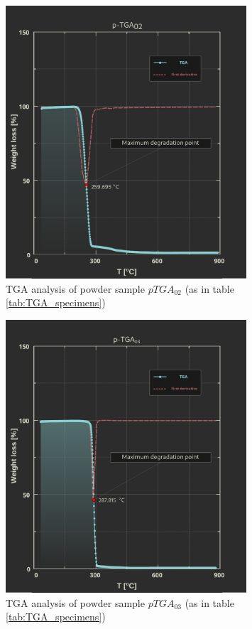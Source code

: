 \documentclass{article}
\begin{document}
        \begin{figure}[h!]
            \centering
            \includegraphics[width=0.8\textwidth]{Pictures/Thermal_analysis_plots/TGA_catalogued/Fixed/p-TGA02.pdf}
            \caption{TGA analysis of powder sample $pTGA_{02}$ (as in table \ref{tab:TGA_specimens})}
            \label{fig:TGA_02}
        \end{figure}
        \begin{figure}[h!]
            \centering
            \includegraphics[width=0.8\textwidth]{Pictures/Thermal_analysis_plots/TGA_catalogued/Fixed/p-TGA03.pdf}
            \caption{TGA analysis of powder sample $pTGA_{03}$ (as in table \ref{tab:TGA_specimens})}
            \label{fig:TGA_03}
        \end{figure}
\end{document}
